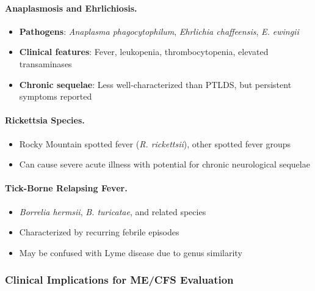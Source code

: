 \paragraph{Anaplasmosis and Ehrlichiosis.}
\begin{itemize}
    \item \textbf{Pathogens}: \emph{Anaplasma phagocytophilum}, \emph{Ehrlichia chaffeensis}, \emph{E. ewingii}
    \item \textbf{Clinical features}: Fever, leukopenia, thrombocytopenia, elevated transaminases
    \item \textbf{Chronic sequelae}: Less well-characterized than PTLDS, but persistent symptoms reported
\end{itemize}

\paragraph{Rickettsia Species.}
\begin{itemize}
    \item Rocky Mountain spotted fever (\emph{R. rickettsii}), other spotted fever groups
    \item Can cause severe acute illness with potential for chronic neurological sequelae
\end{itemize}

\paragraph{Tick-Borne Relapsing Fever.}
\begin{itemize}
    \item \emph{Borrelia hermsii}, \emph{B. turicatae}, and related species
    \item Characterized by recurring febrile episodes
    \item May be confused with Lyme disease due to genus similarity
\end{itemize}

\subsubsection{Clinical Implications for ME/CFS Evaluation}

